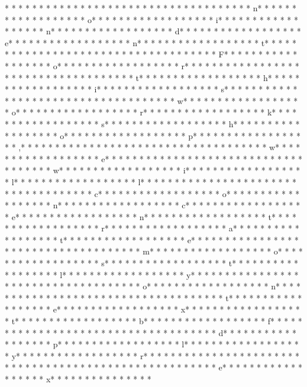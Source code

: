 * * *  * * *  * * *  *  * * *  *  * * *  * 	* * *  * * *  * * *  *  * * *  *  * * *  * n* * *  * * *  * * *  *  * * *  *  * * *  * o* * *  * * *  * * *  *  * * *  *  * * *  * i* * *  * * *  * * *  *  * * *  *  * * *  * n* * *  * * *  * * *  *  * * *  *  * * *  * d* * *  * * *  * * *  *  * * *  *  * * *  * e* * *  * * *  * * *  *  * * *  *  * * *  * n* * *  * * *  * * *  *  * * *  *  * * *  * t* * *  * * *  * * *  *  * * *  *  * * *  *  * * *  * * *  * * *  *  * * *  *  * * *  * F* * *  * * *  * * *  *  * * *  *  * * *  * o* * *  * * *  * * *  *  * * *  *  * * *  * r* * *  * * *  * * *  *  * * *  *  * * *  *  * * *  * * *  * * *  *  * * *  *  * * *  * t* * *  * * *  * * *  *  * * *  *  * * *  * h* * *  * * *  * * *  *  * * *  *  * * *  * i* * *  * * *  * * *  *  * * *  *  * * *  * s* * *  * * *  * * *  *  * * *  *  * * *  *  * * *  * * *  * * *  *  * * *  *  * * *  * w* * *  * * *  * * *  *  * * *  *  * * *  * o* * *  * * *  * * *  *  * * *  *  * * *  * r* * *  * * *  * * *  *  * * *  *  * * *  * k* * *  * * *  * * *  *  * * *  *  * * *  * s* * *  * * *  * * *  *  * * *  *  * * *  * h* * *  * * *  * * *  *  * * *  *  * * *  * o* * *  * * *  * * *  *  * * *  *  * * *  * p* * *  * * *  * * *  *  * * *  *  * * *  * ,* * *  * * *  * * *  *  * * *  *  * * *  *  * * *  * * *  * * *  *  * * *  *  * * *  * w* * *  * * *  * * *  *  * * *  *  * * *  * e* * *  * * *  * * *  *  * * *  *  * * *  *  * * *  * * *  * * *  *  * * *  *  * * *  * w* * *  * * *  * * *  *  * * *  *  * * *  * i* * *  * * *  * * *  *  * * *  *  * * *  * l* * *  * * *  * * *  *  * * *  *  * * *  * l* * *  * * *  * * *  *  * * *  *  * * *  *  * * *  * * *  * * *  *  * * *  *  * * *  * c* * *  * * *  * * *  *  * * *  *  * * *  * o* * *  * * *  * * *  *  * * *  *  * * *  * n* * *  * * *  * * *  *  * * *  *  * * *  * c* * *  * * *  * * *  *  * * *  *  * * *  * e* * *  * * *  * * *  *  * * *  *  * * *  * n* * *  * * *  * * *  *  * * *  *  * * *  * t* * *  * * *  * * *  *  * * *  *  * * *  * r* * *  * * *  * * *  *  * * *  *  * * *  * a* * *  * * *  * * *  *  * * *  *  * * *  * t* * *  * * *  * * *  *  * * *  *  * * *  * e* * *  * * *  * * *  *  * * *  *  * * *  *  * * *  * * *  * * *  *  * * *  *  * * *  * m* * *  * * *  * * *  *  * * *  *  * * *  * o* * *  * * *  * * *  *  * * *  *  * * *  * s* * *  * * *  * * *  *  * * *  *  * * *  * t* * *  * * *  * * *  *  * * *  *  * * *  * l* * *  * * *  * * *  *  * * *  *  * * *  * y* * *  * * *  * * *  *  * * *  *  * * *  *  * * *  * * *  * * *  *  * * *  *  * * *  * o* * *  * * *  * * *  *  * * *  *  * * *  * n* * *  * * *  * * *  *  * * *  *  * * *  *  * * *  * * *  * * *  *  * * *  *  * * *  * t* * *  * * *  * * *  *  * * *  *  * * *  * e* * *  * * *  * * *  *  * * *  *  * * *  * x* * *  * * *  * * *  *  * * *  *  * * *  * t* * *  * * *  * * *  *  * * *  *  * * *  * b* * *  * * *  * * *  *  * * *  *  * * *  * f* * *  * * *  * * *  *  * * *  *  * * *  * {* * *  * * *  * * *  *  * * *  *  * * *  * d* * *  * * *  * * *  *  * * *  *  * * *  * p* * *  * * *  * * *  *  * * *  *  * * *  * l* * *  * * *  * * *  *  * * *  *  * * *  * y* * *  * * *  * * *  *  * * *  *  * * *  * r* * *  * * *  * * *  *  * * *  *  * * *  * }* * *  * * *  * * *  *  * * *  *  * * *  *  * * *  * * *  * * *  *  * * *  *  * * *  * e* * *  * * *  * * *  *  * * *  *  * * *  * x* * *  * * *  * * *  *  * * *  *  * 